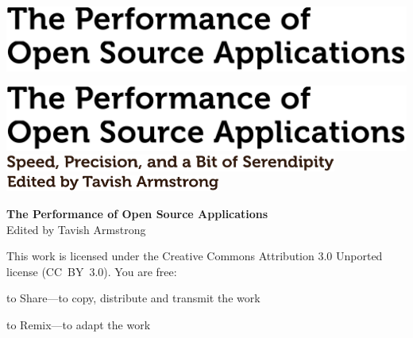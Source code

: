 \newpage

\thispagestyle{empty}
\vspace*{8.5cm}
\hspace{-2.3cm}
\includegraphics[width=445pt]{frontmatter-images/title.pdf}

\newpage

\thispagestyle{empty}
\mbox{}    %

\newpage

\thispagestyle{empty}
\vspace*{8.5cm}
\hspace{-2.3cm}
\includegraphics[width=445pt]{frontmatter-images/title.pdf}
\\
\vspace{0.5cm}   %
\hspace{-1.8cm}   %
\includegraphics[width=310pt]{frontmatter-images/subtitle.pdf}
\vfill
\hfill
\includegraphics[width=200pt]{frontmatter-images/eds.pdf}

\newpage

\thispagestyle{empty}

\small
\noindent \textbf{The Performance of Open Source Applications} \\
Edited by Tavish Armstrong

\vspace{0.15cm}

\noindent
This work is licensed under the Creative Commons Attribution 3.0
Unported license (CC~BY~3.0).  You are free:

\begin{aosaitemize}
  \item to Share---to copy, distribute and transmit the work
  \item to Remix---to adapt the work
\end{aosaitemize}

